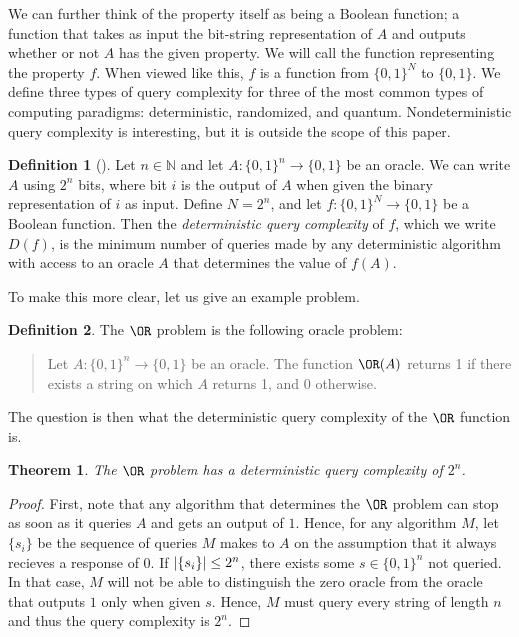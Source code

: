 \documentclass[english,12pt]{reedthesis}
\theoremstyle{plain}
\newtheorem{thm}{Theorem}[section]
\theoremstyle{definition}
\newtheorem{defn}[defn]{Definition}
\theoremstyle{remark}
\DeclarePairedDelimiter{\abs}{\lvert}{\rvert}
\begin{document}
We can further think of the property itself as being a Boolean function; a
function that takes as input the bit-string representation of $A$ and outputs
whether or not $A$ has the given property. We will call the function
representing the property $f$. When viewed like this, $f$ is a function from
$\{0, 1\}^{N}$ to $\{0, 1\}$. We define three types of query complexity for
three of the most common types of computing paradigms: deterministic,
randomized, and quantum. Nondeterministic query complexity is interesting, but
it is outside the scope of this paper.

\begin{defn}[{\cite[17]{AW09}}]\label{def:det-qc}
  Let $n \in \mathbb{N}$ and let $A\colon \{0, 1\}^{n} \rightarrow \{0, 1\}$ be an oracle. We can write
  $A$ using $2^{n}$ bits, where bit $i$ is the output of $A$ when given the
  binary representation of $i$ as input. Define $N = 2^{n}$, and let
  $f\colon \{0, 1\}^{N} \rightarrow \{0, 1\}$ be a Boolean function. Then the
  \emph{deterministic query complexity} of $f$, which we write $D(f)$, is the
  minimum number of queries made by any deterministic algorithm with access to
  an oracle $A$ that determines the value of $f(A)$.
\end{defn}

To make this more clear, let us give an example problem.

\begin{defn}\label{def:or-problem}
  The $\OR$ problem is the following oracle problem:
  \begin{quote}
    Let $A\colon \{0, 1\}^{n} \rightarrow \{0, 1\}$ be an oracle. The function $\OR(A)$
    returns 1 if there exists a string on which $A$ returns 1, and $0$
    otherwise.
  \end{quote}
\end{defn}

The question is then what the deterministic query complexity of the $\OR$
function is.

\begin{thm}
  The $\OR$ problem has a deterministic query complexity of $2^{n}$.
\end{thm}

\begin{proof}
  First, note that any algorithm that determines the $\OR$ problem can stop as
  soon as it queries $A$ and gets an output of $1$. Hence, for any algorithm
  $M$, let $\{s_{i}\}$ be the sequence of queries $M$ makes to $A$ on the
  assumption that it always recieves a response of $0$. If
  $\abs{\{s_{i}\}} \le 2^{n}$, there exists some $s \in \{0, 1\}^{n}$ not queried.
  In that case, $M$ will not be able to distinguish the zero oracle from the
  oracle that outputs $1$ only when given $s$. Hence, $M$ must query every
  string of length $n$ and thus the query complexity is $2^{n}$.
\end{proof}
\end{document}

